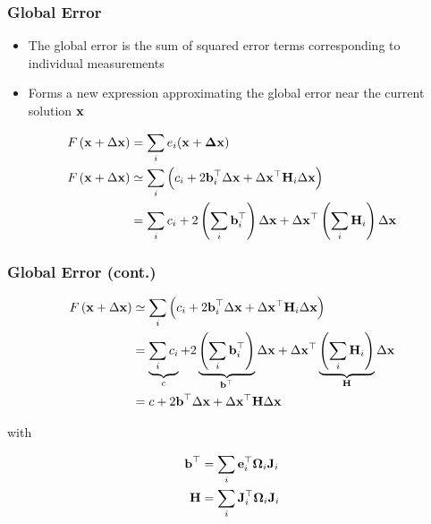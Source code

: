 \begin{frame}
    \frametitle{Global Error}
    
    \begin{itemize}
        \item The global error is the sum of squared error terms corresponding to individual measurements
        \item Forms a new expression approximating the global error near the current solution $\boldsymbol{\mathbf{x}}$
    \end{itemize}
    
    \begin{align*}
        F\left(\boldsymbol{\mathbf{x}} + \Delta \boldsymbol{\mathbf{x}} \right) &= \sum_{i} e_{i}(\boldsymbol{\mathbf{x}} + \boldsymbol{\mathbf{\Delta}}\boldsymbol{\mathbf{x}})\\
        F\left(\boldsymbol{\mathbf{x}} + \Delta \boldsymbol{\mathbf{x}} \right) &\simeq \sum_{i} \left( c_{i} + 2 \boldsymbol{\mathbf{b}}^{\top}_{i} \Delta \boldsymbol{\mathbf{x}} + \Delta \boldsymbol{\mathbf{x}}^{\top} \boldsymbol{\mathbf{H}}_{i} \Delta \boldsymbol{\mathbf{x}} \right) \\
        &= \sum_{i} c_{i} + 2 \left( \sum_{i} \boldsymbol{\mathbf{b}}^{\top}_{i} \right) \Delta \boldsymbol{\mathbf{x}} + \Delta \boldsymbol{\mathbf{x}}^{\top} \left( \sum_{i} \boldsymbol{\mathbf{H}}_{i} \right) \Delta \boldsymbol{\mathbf{x}}
    \end{align*}
    
    
\end{frame}

\begin{frame}
    \frametitle{Global Error (cont.)}
    
    \begin{align*}
        F\left(\boldsymbol{\mathbf{x}} + \Delta \boldsymbol{\mathbf{x}} \right) &\simeq \sum_{i} \left( c_{i} + 2 \boldsymbol{\mathbf{b}}^{\top}_{i} \Delta \boldsymbol{\mathbf{x}} + \Delta \boldsymbol{\mathbf{x}}^{\top} \boldsymbol{\mathbf{H}}_{i} \Delta \boldsymbol{\mathbf{x}} \right) \\
        &= \underbrace{\sum_{i} c_{i}}_{c} + 2 \underbrace{\left( \sum_{i} \boldsymbol{\mathbf{b}}^{\top}_{i} \right)}_{\boldsymbol{\mathbf{b}}^{\top}} \Delta \boldsymbol{\mathbf{x}} + \Delta \boldsymbol{\mathbf{x}}^{\top} \underbrace{\left( \sum_{i} \boldsymbol{\mathbf{H}}_{i} \right)}_{\boldsymbol{\mathbf{H}}} \Delta \boldsymbol{\mathbf{x}} \\
        &= c + 2 \boldsymbol{\mathbf{b}}^{\top} \Delta \boldsymbol{\mathbf{x}} + \Delta \boldsymbol{\mathbf{x}}^{\top} \boldsymbol{\mathbf{H}} \Delta \boldsymbol{\mathbf{x}}
    \end{align*}
    
    with
    
    \begin{align*}
        \boldsymbol{\mathbf{b}}^{\top} &= \sum_{i} \boldsymbol{\mathbf{e}}_{i}^{\top} \boldsymbol{\mathbf{\Omega}}_{i} \boldsymbol{\mathbf{J}}_{i} \\ 
        \boldsymbol{\mathbf{H}} &= \sum_{i}  \boldsymbol{\mathbf{J}}_{i}^{\top} \boldsymbol{\mathbf{\Omega}}_{i} \boldsymbol{\mathbf{J}}_{i}
    \end{align*}
    
    
\end{frame}

